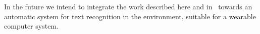 \documentclass{elsart}   %
\begin{document}
In the future we intend to integrate the work described here and
in~\cite{justin} towards an automatic system for text recognition in the
environment, suitable for a wearable computer system. 





\end{document}
